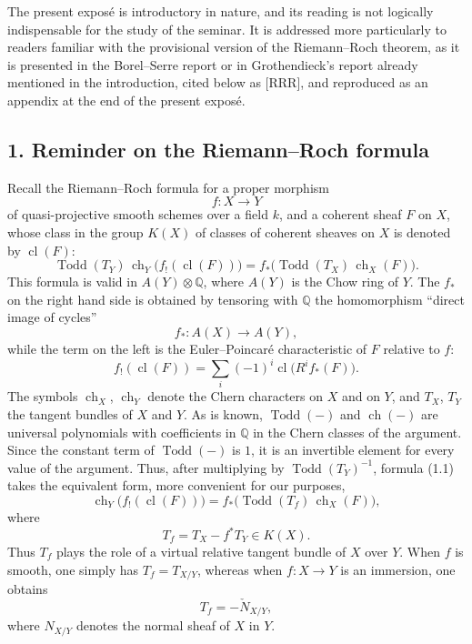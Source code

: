 \documentclass[11pt]{article}
\newcommand{\ch}{\operatorname{ch}}
\newcommand{\Todd}{\operatorname{Todd}}
\newcommand{\cl}{\operatorname{cl}}
\providecommand{\ch}{\operatorname{ch}}
\providecommand{\Todd}{\operatorname{Todd}}
\begin{document}
The present exposé is introductory in nature, and its reading is not logically indispensable for the study of the seminar. It is addressed more particularly to readers familiar with the provisional version of the Riemann--Roch theorem, as it is presented in the Borel--Serre report or in Grothendieck's report already mentioned in the introduction, cited below as [RRR], and reproduced as an appendix at the end of the present exposé.

\subsection*{1. Reminder on the Riemann--Roch formula}
Recall the Riemann--Roch formula for a proper morphism
\[
f:X\longrightarrow Y
\]
of quasi-projective smooth schemes over a field $k$, and a coherent sheaf $F$ on $X$, whose class in the group $K(X)$ of classes of coherent sheaves on $X$ is denoted by $\cl(F)$:
\begin{equation}\tag{1.1}
\Todd(T_Y)\,\ch_Y\bigl(f_!(\cl(F))\bigr)=f_*\bigl(\Todd(T_X)\,\ch_X(F)\bigr).
\end{equation}
This formula is valid in $A(Y)\otimes\mathbb Q$, where $A(Y)$ is the Chow ring of $Y$. The $f_*$ on the right hand side is obtained by tensoring with $\mathbb Q$ the homomorphism ``direct image of cycles''
\[
f_*:A(X)\longrightarrow A(Y),
\]
while the term on the left is the Euler--Poincaré characteristic of $F$ relative to $f$:
\[
f_!(\cl(F))=\sum_i(-1)^i\cl\bigl(R^if_*(F)\bigr).
\]
The symbols $\ch_X$, $\ch_Y$ denote the Chern characters on $X$ and on $Y$, and $T_X$, $T_Y$ the tangent bundles of $X$ and $Y$. As is known, $\Todd(-)$ and $\ch(-)$ are universal polynomials with coefficients in $\mathbb Q$ in the Chern classes of the argument. Since the constant term of $\Todd(-)$ is $1$, it is an invertible element for every value of the argument. Thus, after multiplying by $\Todd(T_Y)^{-1}$, formula (1.1) takes the equivalent form, more convenient for our purposes,
\begin{equation}\tag{1.2}
\ch_Y\bigl(f_!(\cl(F))\bigr)=f_*\bigl(\Todd(T_f)\,\ch_X(F)\bigr),
\end{equation}
where
\begin{equation}\tag{1.3}
T_f=T_X-f^*T_Y\in K(X).
\end{equation}
Thus $T_f$ plays the role of a virtual relative tangent bundle of $X$ over $Y$. When $f$ is smooth, one simply has $T_f=T_{X/Y}$, whereas when $f:X\to Y$ is an immersion, one obtains
\[
T_f=-\check N_{X/Y},
\]
where $N_{X/Y}$ denotes the normal sheaf of $X$ in $Y$.
\end{document}
